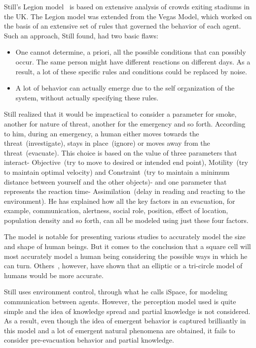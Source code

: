 Still's Legion model~\cite{Still:2000tp} is based on extensive analysis of crowds exiting stadiums in the UK. The Legion model was extended from the Vegas Model, which worked on the basis of an extensive set of rules that governed the behavior of each agent. Such an approach, Still found, had two basic flaws:
\begin{itemize}
\item One cannot determine, a priori, all the possible conditions that can possibly occur. The same person might have different reactions on different days. As a result, a lot of these specific rules and conditions could be replaced by noise.
\item A lot of behavior can actually emerge due to the self organization of the system, without actually specifying these rules.
\end{itemize}
Still realized that it would be impractical to consider a parameter for smoke, another for nature of threat, another for the emergency and so forth. According to him, during an emergency, a human either moves towards the threat~(investigate), stays in place~(ignore) or moves away from the threat~(evacuate). This choice is based on the value of three parameters that interact- Objective~(try to move to desired or intended end point), Motility~(try to maintain optimal velocity) and Constraint~(try to maintain a minimum distance between yourself and the other objects)- and one parameter that represents the reaction time- Assimilation~(delay in reading and reacting to the environment). He has explained how all the key factors in an evacuation, for example, communication, alertness, social role, position, effect of location, population density and so forth, can all be modeled using just these four factors.

The model is notable for presenting various studies to accurately model the size and shape of human beings. But it comes to the conclusion that a square cell will most accurately model a human being considering the possible ways in which he can turn. Others~\cite{Thompson:1995tm,Langston:2006kw}, however, have shown that an elliptic or a tri-circle model of humans would be more accurate.

Still uses environment control, through what he calls iSpace, for modeling communication between agents. However, the perception model used is quite simple and the idea of knowledge spread and partial knowledge is not considered. As a result, even though the idea of emergent behavior is captured brilliantly in this model and a lot of emergent natural phenomena are obtained, it fails to consider pre-evacuation behavior and partial knowledge.

